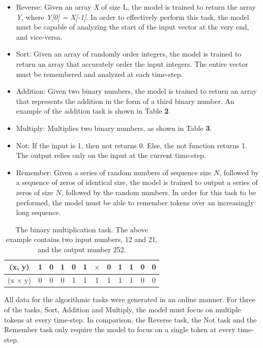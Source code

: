 \documentclass{article}
\begin{document}
\begin{itemize}
    \item Reverse: Given an array \textit{X} of size L, the model is trained to return the array \textit{Y}, where \textit{Y[0] = X[-1]}. In order to effectively perform this task, the model must be capable of analyzing the start of the input vector at the very end, and vice-versa.
    \item Sort: Given an array of randomly order integers, the model is trained to return an array that accurately order the input integers. The entire vector must be remembered and analyzed at each time-step.
    \item Addition: Given two binary numbers, the model is trained to return an array that represents the addition in the form of a third binary number. An example of the addition task is shown in Table \textbf{2}.
    \item Multiply: Multiplies two binary numbers, as shown in Table \textbf{3}.
    \item Not: If the input is 1, then not returns 0. Else, the not function returns 1. The output relies only on the input at the current time-step.
    \item Remember: Given a series of random numbers of sequence size $N$, followed by a sequence of zeros of identical size, the model is trained to output a series of zeros of size $N$, followed by the random numbers. In order for this task to be performed, the model must be able to remember tokens over an increasingly long sequence.
\end{itemize}

\begin{table}[!t]
\begin{center}
    \begin{tabular}{c c c c c c c c c c c c}
    \hline
    (x, y) & 1 & 0 & 1 & 0 & 1 & $\times$ & 0 & 1 & 1 & 0 & 0 \\
    \hline \hline
    (x $\times$ y) & 0 & 0 & 0 & 1 & 1 & 1 & 1 & 1 & 1 & 0 & 0 \\
    \hline
    \end{tabular}
\end{center}
\caption{The binary multiplication task. The above example contains two input numbers, 12 and 21, and the output number 252.} %
\end{table}

All data for the algorithmic tasks were generated in an online manner. For three of the tasks, Sort, Addition and Multiply, the model must focus on multiple tokens at every time-step. In comparison, the Reverse task, the Not task and the Remember task only require the model to focus on a single token at every time-step. 
\end{document}
